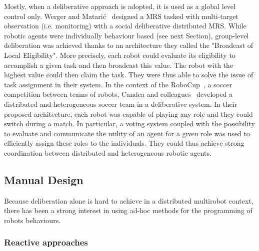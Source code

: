     Mostly, when a deliberative approach is adopted, it is used as a global level control only. Werger and Matarić~\parencite{Werger2000} designed a MRS tasked with multi-target observation (i.e. monitoring) with a social deliberative distributed MRS. While robotic agents were individually behaviour based (see next Section), group-level deliberation was achieved thanks to an architecture they called the "Broadcast of Local Eligibility". More precisely, each robot could evaluate its eligibility to accomplish a given task and then broadcast this value. The robot with the highest value could then claim the task. They were thus able to solve the issue of task assignment in their system. In the context of the RoboCup~\parencite{Kitano1997}, a soccer competition between teams of robots, Candea and colleagues~\parencite{Candea2001} developed a distributed and heterogeneous soccer team in a deliberative system. In their proposed architecture, each robot was capable of playing any role and they could switch during a match. In particular, a voting system coupled with the possibility to evaluate and communicate the utility of an agent for a given role was used to efficiently assign these roles to the individuals. They could thus achieve strong coordination between distributed and heterogeneous robotic agents.


  \subsection{Manual Design}

    Because deliberation alone is hard to achieve in a distributed multirobot context, there has been a strong interest in using ad-hoc methods for the programming of robots behaviours.

    \subsubsection{Reactive approaches}


